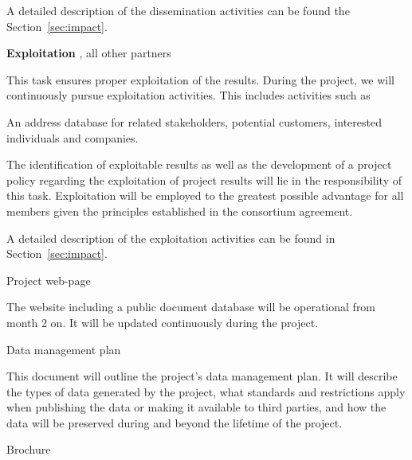 {\begin{tasks}{\WPInnovationNo}
A detailed description of the dissemination activities can be found the Section~\ref{sec:impact}.


\item {\bf Exploitation}
\label{task:wpinnovation:exploitation}
\taskpartner{\IBM, \VW},{ all other partners}

This task ensures proper exploitation of the \Project{} results. During the \Project{} project, we will continuously pursue exploitation activities. This includes activities such as
\begin{denseItemize}
\item An address database for \Project{} related stakeholders, potential customers, interested individuals and companies.
\item The identification of exploitable results as well as the development of a project policy regarding the exploitation of project results will lie in the responsibility of this task. Exploitation will be employed to the greatest possible advantage for all members given the principles established in the consortium agreement.
\end{denseItemize}
A detailed description of the exploitation activities can be found in Section~\ref{sec:impact}.




\end{tasks}

\begin{deliverables}{\WPInnovationNo}
\item Project web-page 
  \label{del:wpinnovation:www}
\delresponsible{\ETHZ}

The website including a public document database will be operational from month 2 on. It will be updated continuously during the project.

\item Data management plan 
  \label{del:wpinnovation:dataman}
 \delresponsible{\ETHZ}

 This document will outline the project's data management plan. It will describe the types of data generated by the project, what standards and restrictions apply when publishing the data or making it available to third parties, and how the data will be preserved during and beyond the lifetime of the project.

\item Brochure 
  \label{del:wpinnovation:knowledge}
 \delresponsible{\PRAGUE}


\end{deliverables}}
